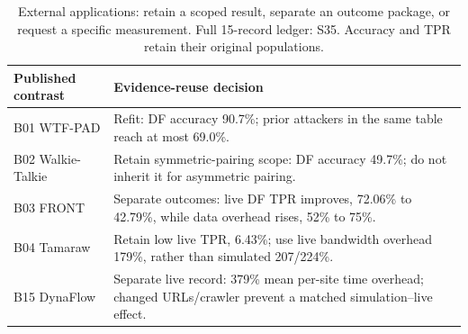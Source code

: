 \begin{table}[t]\centering\footnotesize
\caption{External applications: retain a scoped result, separate an outcome package, or request a specific measurement. Full 15-record ledger: S35. Accuracy and TPR retain their original populations.}\label{tab:r28-external}
\begin{tabularx}{\columnwidth}{@{}>{\raggedright\arraybackslash}p{}Y@{}}\toprule
Published contrast & Evidence-reuse decision\\\midrule
B01 WTF-PAD \cite{sirinam2018deep} & Refit: DF accuracy 90.7\%; prior attackers in the same table reach at most 69.0\%.\\
B02 Walkie-Talkie \cite{sirinam2018deep} & Retain symmetric-pairing scope: DF accuracy 49.7\%; do not inherit it for asymmetric pairing.\\
B03 FRONT \cite{gong2021wfdefproxy} & Separate outcomes: live DF TPR improves, 72.06\% to 42.79\%, while data overhead rises, 52\% to 75\%.\\
B04 Tamaraw \cite{gong2021wfdefproxy} & Retain low live TPR, 6.43\%; use live bandwidth overhead 179\%, rather than simulated 207/224\%.\\
B15 DynaFlow \cite{mathews2023critical} & Separate live record: 379\% mean per-site time overhead; changed URLs/crawler prevent a matched simulation--live effect.\\
\bottomrule\end{tabularx}
\end{table}
